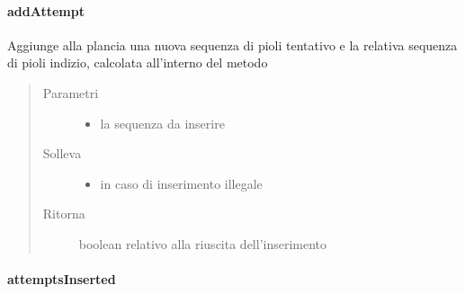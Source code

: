 \documentclass[letterpaper,10pt,italian,openany,oneside]{sphinxmanual}
\begin{document}
\paragraph{addAttempt}
\label{\detokenize{source/it/unicam/cs/pa/mastermind/gamecore/BoardModel:addattempt}}

\begin{fulllineitems}
\label{\detokenize{source/it/unicam/cs/pa/mastermind/gamecore/BoardModel:it.unicam.cs.pa.mastermind.gamecore.BoardModel.addAttempt(List)}}
Aggiunge alla plancia una nuova sequenza di pioli tentativo e la relativa sequenza di pioli indizio, calcolata all’interno del metodo
\begin{quote}\begin{description}
\item[{Parametri}] \leavevmode\begin{itemize}
\item {} 
 \textendash{} la sequenza da inserire

\end{itemize}

\item[{Solleva}] \leavevmode\begin{itemize}
\item {} 
 \textendash{} in caso di inserimento illegale

\end{itemize}

\item[{Ritorna}] \leavevmode
boolean relativo alla riuscita dell’inserimento

\end{description}\end{quote}

\end{fulllineitems}



\paragraph{attemptsInserted}
\label{\detokenize{source/it/unicam/cs/pa/mastermind/gamecore/BoardModel:attemptsinserted}}
\end{document}
